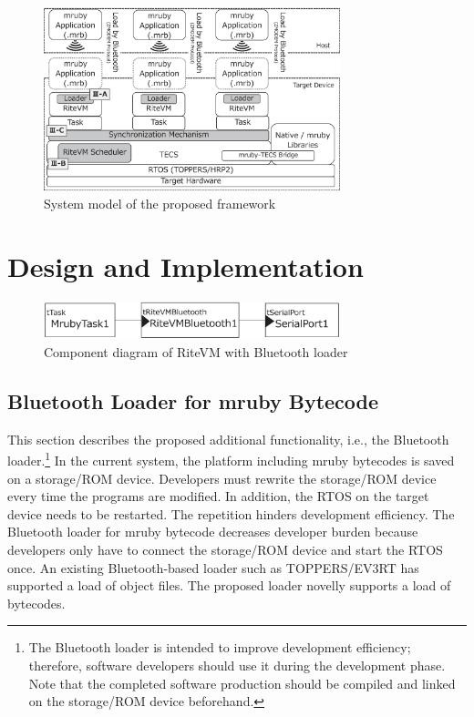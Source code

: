 \documentclass[conference]{IEEEtran/IEEEtran/IEEEtran}
\begin{document}
\begin{figure}[t]
    \centering
    \includegraphics[width=8.6cm,clip]{figure/system_model.eps}
    \vspace{-3mm}
\caption{System model of the proposed framework}
    \vspace{-3mm}
\label{fig:system_model}
\end{figure}

\section{Design and Implementation}
\label{sec:Design and Implementation}

\begin{figure}[t]
    \centering
    \includegraphics[width=8.6cm,clip]{figure/component_bluetooth.eps}
    \vspace{-3mm}
\caption{Component diagram of RiteVM with Bluetooth loader}
    \vspace{-3mm}
\label{fig:component_bluetooth}
\end{figure}

\subsection{Bluetooth Loader for mruby Bytecode}
\label{sec:Bluetooth loader for mruby bytecode}
This section describes the proposed additional functionality, i.e., the Bluetooth loader.\footnote{
The Bluetooth loader is intended to improve development efficiency; therefore, software developers should use it during the development phase.
Note that the completed software production should be compiled and linked on the storage/ROM device beforehand.
}
In the current system, the platform including mruby bytecodes is saved on a storage/ROM device.
Developers must rewrite the storage/ROM device every time the programs are modified.
In addition, the RTOS on the target device needs to be restarted.
The repetition hinders development efficiency.
The Bluetooth loader for mruby bytecode decreases developer burden because developers only have to connect the storage/ROM device and start the RTOS once. 
An existing Bluetooth-based loader such as TOPPERS/EV3RT \cite{par:EV3} has supported a load of object files.
The proposed loader novelly supports a load of bytecodes.
\end{document}
